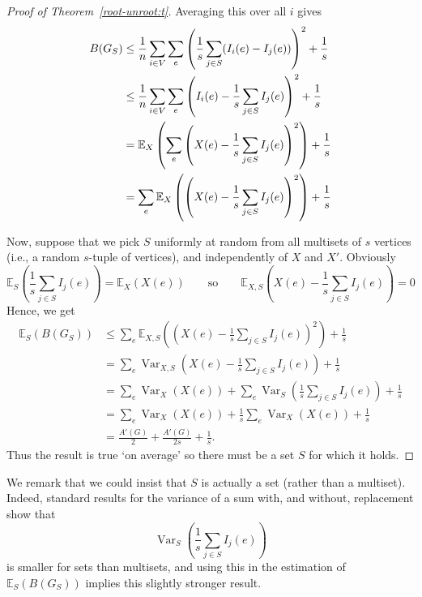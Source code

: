 \documentclass[11pt]{article}
\theoremstyle{remark}
\DeclareMathOperator\var{Var}
\def\E{\mathbb{E}}
\begin{document}
\begin{proof}[Proof of Theorem~\ref{root-unroot:t}]
  Averaging this  over all $i$
  gives
  \begin{align*}\label{e:rbarw}
    B(G_S)
    &\le \frac{1}{n}\sum_{i\in V} \sum_e \left(\frac1s\sum_{j\in
        S}(I_i(e)-I_j(e))\right)^2+\frac1{s}\notag\\
    &\le \frac{1}{n}\sum_{i\in V} \sum_e \left(I_i(e)-\frac1s\sum_{j\in
        S}I_j(e)\right)^2+\frac1{s}\notag\\
    &= \E_X\left(\sum_e \left(X(e)-\frac1s\sum_{j\in
        S}I_j(e)\right)^2\right)+\frac1{s}\notag\\
    &= \sum_e \E_X \left(\left(X(e)-\frac1s\sum_{j\in
        S}I_j(e)\right)^2\right)+\frac1{s}\notag\\
  \end{align*}
  
  Now, suppose that we pick $S$ uniformly at random from all
  multisets of $s$ vertices (i.e., a random $s$-tuple of
  vertices), and independently of $X$ and $X'$. Obviously
  \[\E_S\left(\frac1s\sum_{j\in S}I_j(e)\right)=\E_X(X(e))\qquad\text{so}\qquad
  \E_{X,S} \left(X(e)-\frac1s\sum_{j\in
        S}I_j(e)\right)=0
  \]
Hence, we get
\begin{align*}
    \E_S(B(G_S))&\le  \sum_e \E_{X,S} \left(\left(X(e)-\frac1s\sum_{j\in
        S}I_j(e)\right)^2\right)+\frac1{s}\\
  &=\sum_e \var_{X,S} \left(X(e)-\frac1s\sum_{j\in
        S}I_j(e)\right) +\frac1{s}\\
  &=\sum_e \var_{X} \left(X(e)\right)+\sum_e\var_{S}\left(\frac1s\sum_{j\in
        S}I_j(e)\right) +\frac1{s}\\
  &=\sum_e \var_{X} \left(X(e)\right)+\frac1s\sum_e\var_{X}(X(e)) +\frac1{s}\\
  &=\frac{A'(G)}{2}+\frac{A'(G)}{2s} +\frac1{s}.
\end{align*}
Thus the result is true `on average' so there must be a set $S$ for which it holds.
\end{proof}
We remark that we could insist that $S$ is actually a set (rather
than a multiset). Indeed, standard results for the variance of a sum
with, and without, replacement show that
\[\var_{S}\left(\frac1s\sum_{j\in
    S}I_j(e)\right)\] is smaller for sets than multisets, and using
this in the estimation of $\E_S(B(G_S))$ implies this slightly
stronger result.
\end{document}
